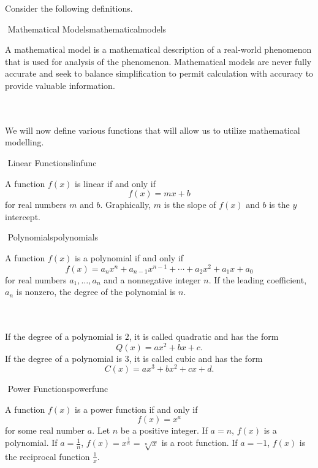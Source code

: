 		Consider the following definitions.
		\begin{definition}{\Stop\,\,Mathematical Models}{mathematicalmodels}
			
			A mathematical model is a mathematical description of a real-world phenomenon that is used for analysis of the phenomenon. Mathematical models are never fully accurate and seek to balance simplification to permit calculation with accuracy to provide valuable information.

		\end{definition}
		\vphantom
		\\
		\\
		We will now define various functions that will allow us to utilize mathematical modelling.
		\begin{definition}{\Stop\,\,Linear Functions}{linfunc}
			
			A function \(f(x)\) is linear if and only if
			\begin{equation*}
				f(x)=mx+b
			\end{equation*}
			for real numbers \(m\) and \(b\). Graphically, \(m\) is the slope of \(f(x)\) and \(b\) is the \(y\) intercept.

		\end{definition}
		\begin{definition}{\Stop\,\,Polynomials}{polynomials}

			A function \(f(x)\) is a polynomial if and only if
			\begin{equation*}
				f(x)=a_nx^n+a_{n-1}x^{n-1}+\cdots+a_2x^2+a_1x+a_0
			\end{equation*}
			for real numbers \(a_1,\ldots,a_n\) and a nonnegative integer \(n\). If the leading coefficient, \(a_n\) is nonzero, the degree of the polynomial is \(n\).
			
		\end{definition}
		\vphantom
		\\
		\\
		If the degree of a polynomial is \(2\), it is called quadratic and has the form
		\begin{equation*}
			Q(x)=ax^2+bx+c.
		\end{equation*}
		If the degree of a polynomial is \(3\), it is called cubic and has the form
		\begin{equation*}
			C(x)=ax^3+bx^2+cx+d.
		\end{equation*}
		\begin{definition}{\Stop\,\,Power Functions}{powerfunc}

			A function \(f(x)\) is a power function if and only if
			\begin{equation*}
				f(x)=x^a
			\end{equation*}
			for some real number \(a\). Let \(n\) be a positive integer. If \(a=n\), \(f(x)\) is a polynomial. If \(a=\frac{1}{n}\), \(f(x)=x^\frac{1}{n}=\sqrt[n]{x}\) is a root function. If \(a=-1\), \(f(x)\) is the reciprocal function \(\frac{1}{x}\).
			
		\end{definition}
